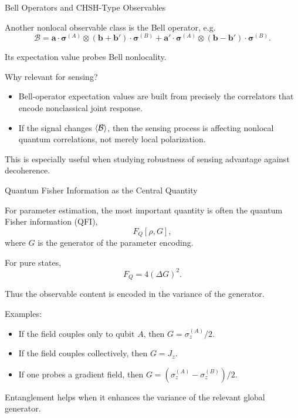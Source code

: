\documentclass{beamer}
\begin{document}
\begin{frame}{Bell Operators and CHSH-Type Observables}

Another nonlocal observable class is the Bell operator, e.g.
\[
\mathcal{B}
=
\mathbf{a}\cdot\bm{\sigma}^{(A)}\otimes
(\mathbf{b}+\mathbf{b}')\cdot\bm{\sigma}^{(B)}
+
\mathbf{a}'\cdot\bm{\sigma}^{(A)}\otimes
(\mathbf{b}-\mathbf{b}')\cdot\bm{\sigma}^{(B)}.
\]

Its expectation value probes Bell nonlocality.

Why relevant for sensing?
\begin{itemize}
    \item Bell-operator expectation values are built from precisely the correlators
    that encode nonclassical joint response.
    \item If the signal changes $\expval{\mathcal{B}}$, then the sensing process is affecting
    nonlocal quantum correlations, not merely local polarization.
\end{itemize}

This is especially useful when studying robustness of sensing advantage against decoherence.

\end{frame}

\begin{frame}{Quantum Fisher Information as the Central Quantity}

For parameter estimation, the most important quantity is often the
quantum Fisher information (QFI),
\[
F_Q[\rho,G],
\]
where $G$ is the generator of the parameter encoding.

For pure states,
\[
F_Q = 4(\Delta G)^2.
\]

Thus the observable content is encoded in the variance of the generator.

Examples:
\begin{itemize}
    \item If the field couples only to qubit $A$, then $G=\sigma_z^{(A)}/2$.
    \item If the field couples collectively, then $G=J_z$.
    \item If one probes a gradient field, then $G=(\sigma_z^{(A)}-\sigma_z^{(B)})/2$.
\end{itemize}

Entanglement helps when it enhances the variance of the relevant global generator.

\end{frame}
\end{document}
